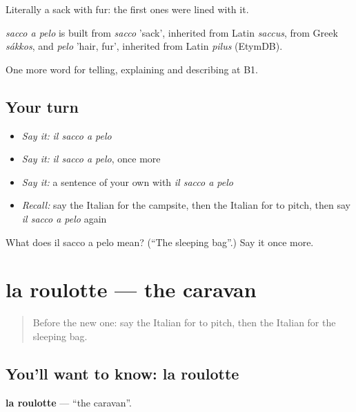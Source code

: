 Literally a sack with fur: the first ones were lined with it.

\begin{cousinweb}
\emph{sacco a pelo} is built from \emph{sacco} 'sack', inherited from Latin \emph{saccus}, from Greek \emph{sákkos}, and \emph{pelo} 'hair, fur', inherited from Latin \emph{pilus} (EtymDB).
\end{cousinweb}

\begin{grammarlens}[title={What you've built}]
One more word for telling, explaining and describing at B1.
\end{grammarlens}

\subsection*{Your turn}
\begin{itemize}
\raggedright
  \item \emph{Say it:} \emph{il sacco a pelo}
  \item \emph{Say it:} \emph{il sacco a pelo}, once more
  \item \emph{Say it:} a sentence of your own with \emph{il sacco a pelo}
  \item \emph{Recall:} say the Italian for the campsite, then the Italian for to pitch, then say \emph{il sacco a pelo} again
\end{itemize}

\begin{tcolorbox}[breakable,colback=teal!4,colframe=teal!35!black,title={Before you move on}]
What does il sacco a pelo mean? (\textquotedblleft{}The sleeping bag\textquotedblright{}.) Say it once more.
\end{tcolorbox}
\section[la roulotte]{la roulotte — the caravan}

\label{lesson:IT-C430-roulotte}



\begin{quote}
Before the new one: say the Italian for to pitch, then the Italian for the sleeping bag.
\end{quote}

\subsection*{You'll want to know: la roulotte}
\textbf{la roulotte} — \textquotedblleft{}the caravan\textquotedblright{}.

